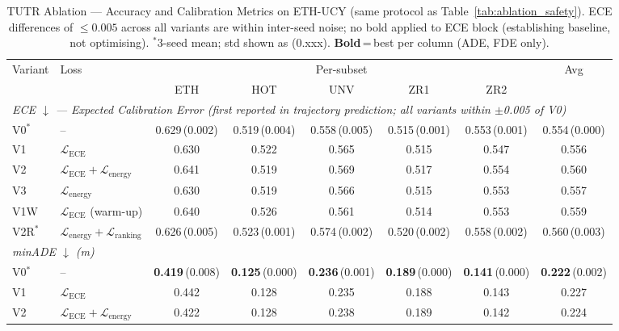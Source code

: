 \documentclass[journal]{IEEEtran}
\begin{document}
\begin{table}[tp]
\caption{TUTR Ablation --- Accuracy and Calibration Metrics on ETH-UCY
  (same protocol as Table~\ref{tab:ablation_safety}).
  ECE differences of ${\leq}0.005$ across all variants are within inter-seed noise;
  no bold applied to ECE block (establishing baseline, not optimising).
  $^*$3-seed mean; std shown as (0.xxx). \textbf{Bold}\,=\,best per column (ADE, FDE only).}
\label{tab:ablation_accuracy}
\centering
\setlength{\tabcolsep}{4.2pt}
\begin{tabular}{l l c c c c c c}
\toprule
\multirow{2}{*}{Variant} & \multirow{2}{*}{Loss} &
  \multicolumn{5}{c}{Per-subset} & \multirow{2}{*}{Avg} \\
\cmidrule(lr){3-7}
& & ETH & HOT & UNV & ZR1 & ZR2 & \\
\midrule
\multicolumn{8}{l}{\textit{ECE $\downarrow$ --- Expected Calibration Error
  (first reported in trajectory prediction; all variants within $\pm$0.005 of V0)}} \\[1pt]
V0$^*$  & --
  & 0.629\,(0.002) & 0.519\,(0.004) & 0.558\,(0.005)
  & 0.515\,(0.001) & 0.553\,(0.001) & 0.554\,(0.000) \\
V1   & $\mathcal{L}_\mathrm{ECE}$
  & 0.630 & 0.522 & 0.565 & 0.515 & 0.547 & 0.556 \\
V2   & $\mathcal{L}_\mathrm{ECE}{+}\mathcal{L}_\mathrm{energy}$
  & 0.641 & 0.519 & 0.569 & 0.517 & 0.554 & 0.560 \\
V3   & $\mathcal{L}_\mathrm{energy}$
  & 0.630 & 0.519 & 0.566 & 0.515 & 0.553 & 0.557 \\
V1W  & $\mathcal{L}_\mathrm{ECE}$ (warm-up)
  & 0.640 & 0.526 & 0.561 & 0.514 & 0.553 & 0.559 \\
V2R$^*$ & $\mathcal{L}_\mathrm{energy}{+}\mathcal{L}_\mathrm{ranking}$
  & 0.626\,(0.005) & 0.523\,(0.001) & 0.574\,(0.002)
  & 0.520\,(0.002) & 0.558\,(0.002) & 0.560\,(0.003) \\
\midrule
\multicolumn{8}{l}{\textit{minADE $\downarrow$ (m)}} \\[1pt]
V0$^*$  & --
  & \textbf{0.419}\,(0.008) & \textbf{0.125}\,(0.000)
  & \textbf{0.236}\,(0.001) & \textbf{0.189}\,(0.000)
  & \textbf{0.141}\,(0.000) & \textbf{0.222}\,(0.002) \\
V1   & $\mathcal{L}_\mathrm{ECE}$
  & 0.442 & 0.128 & 0.235 & 0.188 & 0.143 & 0.227 \\
V2   & $\mathcal{L}_\mathrm{ECE}{+}\mathcal{L}_\mathrm{energy}$
  & 0.422 & 0.128 & 0.238 & 0.189 & 0.142 & 0.224 \\

\end{tabular}
\end{table}
\end{document}
